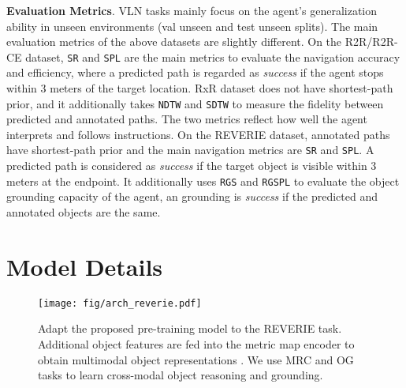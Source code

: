 \vspace{1mm}
\noindent\textbf{Evaluation Metrics}. VLN tasks mainly focus on the agent's generalization ability in unseen environments (val unseen and test unseen splits).
The main evaluation metrics of the above datasets are slightly different.
On the R2R/R2R-CE dataset, \texttt{SR} and \texttt{SPL} are the main metrics to evaluate the navigation accuracy and efficiency, where a predicted path is regarded as \textit{success} if the agent stops within 3 meters of the target location. 
RxR dataset does not have shortest-path prior, and it additionally takes \texttt{NDTW} and \texttt{SDTW} to measure the fidelity between predicted and annotated paths. The two metrics reflect how well the agent interprets and follows instructions. 
On the REVERIE dataset, annotated paths have shortest-path prior and the main navigation metrics are \texttt{SR} and \texttt{SPL}. A predicted path is considered as \textit{success} if the target object is visible within 3 meters at the endpoint. 
It additionally uses \texttt{RGS} and \texttt{RGSPL} to evaluate the object grounding capacity of the agent, an grounding is \textit{success} if the predicted and annotated objects are the same.



\section{Model Details}\label{sec:sup_model}
\begin{figure*}[h]
\centering
\texttt{[image: fig/arch\_reverie.pdf]}
\vspace{-3mm}
\caption{
Adapt the proposed pre-training model to the REVERIE task. 
Additional object features  are fed into the metric map encoder to obtain multimodal object representations . 
We use MRC and OG tasks to learn cross-modal object reasoning and grounding.
}\label{fig:arch_reverie}
\vspace{-3mm}
\end{figure*}


